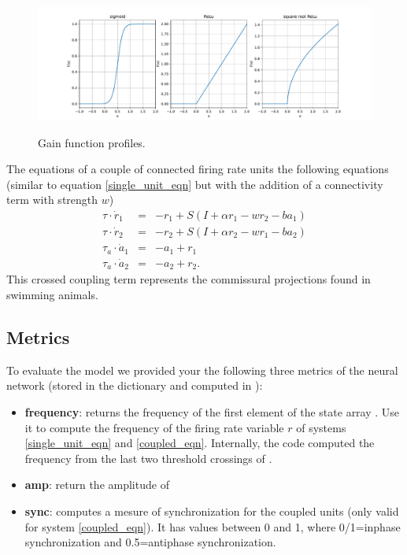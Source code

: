 \documentclass{cmc}
\begin{document}
\begin{figure}
	\centering \includegraphics[width=1\linewidth]{figures/gains}\\
    \caption{Gain function profiles.
    \label{fig:plot_gains}}
\end{figure}

The equations of a couple of connected firing rate units the following equations (similar to equation \ref{single_unit_eqn} but with the addition of a connectivity term with strength $w$)
\begin{equation}
    \begin{array}{lcl}
    \tau \cdot \dot{r}_1 & = & -r_1 + S(I + \alpha r_1 - w r_2 - b a_1) \\
    \tau \cdot \dot{r}_2 & = & -r_2 + S(I + \alpha r_2 - w r_1 - b a_2) \\
    \tau_a \cdot \dot{a}_1 & = & -a_1 + r_1 \\
    \tau_a \cdot \dot{a}_2 & = & -a_2 + r_2.
    \end{array}
    \label{coupled_eqn}
\end{equation}
This crossed coupling term represents the commissural projections found in swimming animals.

\subsection*{Metrics}
To evaluate the model we provided your the following three metrics of the neural network (stored in the dictionary  and computed in ):
\begin{itemize}
\item \textbf{frequency}: returns the frequency of the first element of the state array . Use it to compute the frequency of the firing rate variable $r$ of systems \ref{single_unit_eqn} and \ref{coupled_eqn}. Internally, the code computed the frequency from the last two threshold crossings of .
\item \textbf{amp}: return the amplitude of 
\item \textbf{sync}: computes a mesure of synchronization for the coupled units (only valid for system \ref{coupled_eqn}). It has values between 0 and 1, where 0/1=inphase synchronization and 0.5=antiphase synchronization.
\end{itemize}
\end{document}
